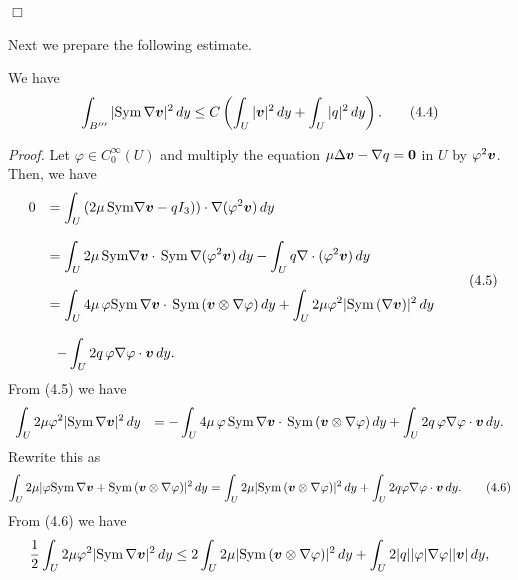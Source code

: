  

\noindent
$\Box$


Next we prepare the following estimate.

We have
$$\displaystyle
\int_{B'''}\vert\text{Sym}\,\nabla\mbox{\boldmath $v$}\vert^2\,dy
\le C\left(\int_{U}\vert\mbox{\boldmath $v$}\vert^2\,dy
+\int_{U}\vert q\vert^2\,dy\right).
\tag {4.4}
$$

\endproclaim

{\it\noindent Proof.}
Let $\varphi\in C_0^{\infty}(U)$ and multiply the equation
$\mu\Delta\mbox{\boldmath $v$}-\nabla q=\mbox{\boldmath $0$}$ in $U$ by $\varphi^2\mbox{\boldmath $v$}$.
Then, we have
$$\begin{array}{ll}
\displaystyle
0
&
\displaystyle
=\int_U\left(2\mu\,\text{Sym}\nabla\mbox{\boldmath $v$}-qI_3)\right)\cdot\nabla(\varphi^2\mbox{\boldmath $v$})\,dy
\\
\\
\displaystyle
&
\displaystyle
=\int_U2\mu\,\text{Sym}\nabla\mbox{\boldmath $v$}\cdot\,\text{Sym}\,\nabla(\varphi^2\mbox{\boldmath $v$})\,dy
-\int_Uq\nabla\cdot(\varphi^2\mbox{\boldmath $v$})\,dy
\\
\\
\displaystyle
&
\displaystyle
=
\int_U4\mu\,\varphi\text{Sym}\,\nabla\mbox{\boldmath $v$}\cdot\,\text{Sym}\,(\mbox{\boldmath $v$}\otimes\nabla\varphi)\,dy
+\int_U2\mu\varphi^2\vert\text{Sym}\,(\nabla\mbox{\boldmath $v$})\vert^2\,dy
\\
\\
\displaystyle
&
\displaystyle
\,\,\,
-\int_U2q\,\varphi\nabla\varphi\cdot\mbox{\boldmath $v$}\,dy.
\end{array}
\tag {4.5}
$$
From (4.5) we have
$$\begin{array}{ll}
\displaystyle
\int_U2\mu\varphi^2\vert\text{Sym}\,\nabla\mbox{\boldmath $v$}\vert^2\,dy
&
\displaystyle
=-\int_U4\mu\,\varphi\,\text{Sym}\,\nabla\mbox{\boldmath $v$}\cdot\,\text{Sym}\,(\mbox{\boldmath $v$}\otimes\nabla\varphi)\,dy
+\int_U2q\,\varphi\nabla\varphi\cdot\mbox{\boldmath $v$}\,dy.
\end{array}
$$
Rewrite this as
$$
\displaystyle
\int_U2\mu\vert \varphi\text{Sym}\,\nabla\mbox{\boldmath $v$}+\text{Sym}\,(\mbox{\boldmath $v$}\otimes\nabla\varphi)\vert^2\,dy
=\int_U2\mu\vert\text{Sym}\,(\mbox{\boldmath $v$}\otimes\nabla\varphi)\vert^2\,dy
+\int_U 2q\varphi\nabla\varphi\cdot\mbox{\boldmath $v$}\,dy.
\tag {4.6}
$$
From (4.6) we have
$$\displaystyle
\frac{1}{2}\int_U2\mu\varphi^2\vert\text{Sym}\,\nabla\mbox{\boldmath $v$}\vert^2\,dy
\le 
2\int_U2\mu\vert\text{Sym}\,(\mbox{\boldmath $v$}\otimes\nabla\varphi)\vert^2\,dy
+\int_U2\vert q\vert\vert\varphi\vert\nabla\varphi\vert\vert\mbox{\boldmath $v$}\vert\,dy,
$$
